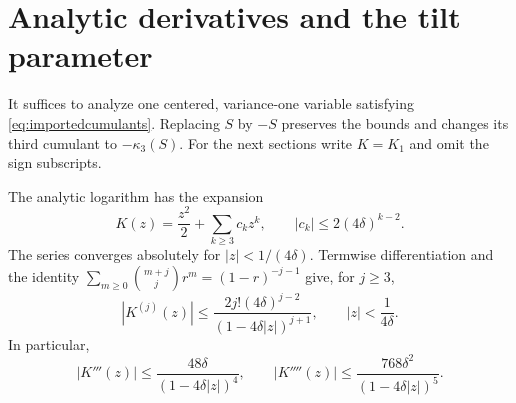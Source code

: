 \documentclass[11pt]{article}
\numberwithin{equation}{section}
\theoremstyle{remark}
\begin{document}
\section{Analytic derivatives and the tilt parameter}\label{sec:derivatives}

It suffices to analyze one centered, variance-one variable satisfying
\eqref{eq:importedcumulants}. Replacing $S$ by $-S$ preserves the bounds and
changes its third cumulant to $-\kappa_3(S)$. For the next sections write
$K=K_1$ and omit the sign subscripts.

The analytic logarithm has the expansion
\begin{equation}\label{eq:series}
 K(z)=\frac{z^2}{2}+\sum_{k\ge3}c_kz^k,
 \qquad |c_k|\le2(4\delta)^{k-2}.
\end{equation}
The series converges absolutely for $|z|<1/(4\delta)$. Termwise
differentiation and the identity
$\sum_{m\ge0}\binom{m+j}{j}r^m=(1-r)^{-j-1}$ give, for $j\ge3$,
\begin{equation}\label{eq:derivativegeneral}
 |K^{(j)}(z)|
 \le\frac{2j!(4\delta)^{j-2}}{(1-4\delta|z|)^{j+1}},
 \qquad |z|<\frac1{4\delta}.
\end{equation}
In particular,
\begin{equation}\label{eq:derivative34}
 |K'''(z)|\le\frac{48\delta}{(1-4\delta|z|)^4},\qquad
 |K''''(z)|\le\frac{768\delta^2}{(1-4\delta|z|)^5}.
\end{equation}
\end{document}
